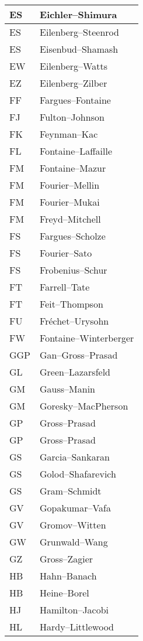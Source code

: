 \documentclass{amsart}
\numberwithin{equation}{section}
\theoremstyle{plain}
\numberwithin{equation}{section}
\theoremstyle{remark}
\begin{document}
\begin{longtable}{l|l}
ES & Eichler--Shimura\\ \hline
ES & Eilenberg--Steenrod\\ \hline
ES & Eisenbud--Shamash\\ \hline
EW & Eilenberg--Watts\\ \hline
EZ & Eilenberg--Zilber\\ \hline
FF & Fargues--Fontaine\\ \hline
FJ & Fulton--Johnson\\ \hline
FK & Feynman--Kac\\ \hline
FL & Fontaine--Laffaille\\ \hline
FM & Fontaine--Mazur\\ \hline
FM & Fourier--Mellin\\ \hline
FM & Fourier--Mukai\\ \hline
FM & Freyd--Mitchell\\ \hline
FS & Fargues--Scholze\\ \hline
FS & Fourier--Sato\\ \hline
FS & Frobenius--Schur\\ \hline
FT & Farrell--Tate\\ \hline
FT & Feit--Thompson\\ \hline
FU & Fréchet--Urysohn\\ \hline
FW & Fontaine--Winterberger\\ \hline
GGP & Gan--Gross--Prasad\\ \hline
GL & Green--Lazarsfeld\\ \hline
GM & Gauss--Manin\\ \hline
GM & Goresky--MacPherson\\ \hline
GP & Gross--Prasad\\ \hline
GP & Gross--Prasad\\ \hline
GS & Garcia--Sankaran\\ \hline
GS & Golod--Shafarevich\\ \hline
GS & Gram--Schmidt\\ \hline
GV & Gopakumar--Vafa\\ \hline
GV & Gromov--Witten\\ \hline
GW & Grunwald--Wang\\ \hline
GZ & Gross--Zagier\\ \hline
HB & Hahn--Banach\\ \hline
HB & Heine--Borel\\ \hline
HJ & Hamilton--Jacobi\\ \hline
HL & Hardy--Littlewood\\ \hline

\end{longtable}
\end{document}
